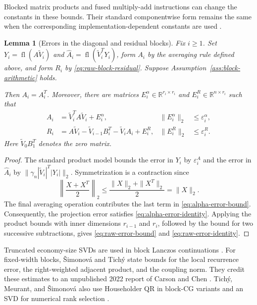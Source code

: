 \documentclass[11pt]{article}
\newtheorem{lemma}{Lemma}
\theoremstyle{definition}
\newcommand{\fl}{\operatorname{fl}}
\newcommand{\R}{\mathbb{R}}
\newcommand{\eps}{\varepsilon}
\begin{document}
Blocked matrix products and fused multiply-add instructions can change the
constants in these bounds.  Their standard componentwise form remains the
same when the corresponding implementation-dependent constants are used
\cite[Sec.~3.5]{Higham2002}.

\begin{lemma}[Errors in the diagonal and residual blocks]
\label{lem:block-arithmetic}
Fix $i\ge1$.  Set $Y_i=\fl(A\widetilde V_i)$ and
$\widehat A_i=\fl(\widetilde V_i^TY_i)$, form $A_i$ by the averaging rule
defined above, and form $R_i$ by \eqref{eq:raw-block-residual}.  Suppose
Assumption~\ref{ass:block-arithmetic} holds.

Then $A_i=A_i^T$.  Moreover, there are matrices
$E_i^\alpha\in\R^{r_i\times r_i}$ and
$E_i^R\in\R^{n\times r_i}$ such that
\begin{align}
 A_i&=\widetilde V_i^TA\widetilde V_i+E_i^\alpha,
 &\|E_i^\alpha\|_2&\le\eps_i^\alpha,
 \label{eq:alpha-error-identity}\\
 R_i&=A\widetilde V_i-\widetilde V_{i-1}B_i^T-
       \widetilde V_iA_i+E_i^R,
 &\|E_i^R\|_2&\le\eps_i^R.
 \label{eq:raw-error-identity}
\end{align}
Here $\widetilde V_0B_1^T$ denotes the zero matrix.
\end{lemma}

\begin{proof}
The standard product model bounds the error in $Y_i$ by $\eps_i^A$ and
the error in $\widehat A_i$ by
$\|\gamma_n|\widetilde V_i|^T|Y_i|\|_2$.  Symmetrization is a contraction since
\[
 \left\|\frac{X+X^T}{2}\right\|_2
 \le\frac{\|X\|_2+\|X^T\|_2}{2}=\|X\|_2.
\]
The final averaging operation contributes the last term in
\eqref{eq:alpha-error-bound}.  Consequently, the projection error satisfies
\eqref{eq:alpha-error-identity}.  Applying the product bounds with inner
dimensions $r_{i-1}$ and $r_i$, followed by the bound for two successive
subtractions, gives
\eqref{eq:raw-error-bound} and \eqref{eq:raw-error-identity}.
\end{proof}

Truncated economy-size SVDs are used in block Lanczos continuations
\cite[Sec.~6.2]{SimonovaTichy2025}.  For fixed-width blocks,
\v{S}imonov\'a and Tich\'y state bounds for the local recurrence error,
the right-weighted adjacent product, and the coupling norm.  They credit
these estimates to an unpublished 2022 report of Carson and Chen
\cite[Sec.~4, eqs.~(9), (11), (12)]{SimonovaTichy2025}.
Tich\'y, Meurant, and \v{S}imonov\'a also use Householder QR in block-CG
variants and an SVD for numerical rank selection
\cite{TichyMeurantSimonova2025}.
\end{document}
